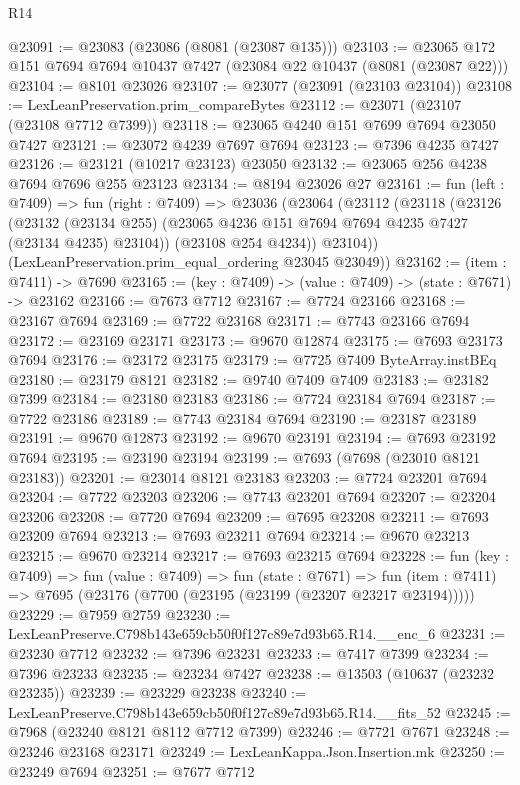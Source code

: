 \begin{lexlean}{R14}
\begin{coremodule}
@23091 := @23083 (@23086 (@8081 (@23087 @135)))
@23103 := @23065 @172 @151 @7694 @7694 @10437 @7427 (@23084 @22 @10437 (@8081 (@23087 @22)))
@23104 := @8101 @23026
@23107 := @23077 (@23091 (@23103 @23104))
@23108 := LexLeanPreservation.prim_compareBytes
@23112 := @23071 (@23107 (@23108 @7712 @7399))
@23118 := @23065 @4240 @151 @7699 @7694 @23050 @7427
@23121 := @23072 @4239 @7697 @7694
@23123 := @7396 @4235 @7427
@23126 := @23121 (@10217 @23123) @23050
@23132 := @23065 @256 @4238 @7694 @7696 @255 @23123
@23134 := @8194 @23026 @27
@23161 := fun (left : @7409) =>
  fun (right : @7409) =>
  @23036
    (@23064
      (@23112
        (@23118
          (@23126
            (@23132 (@23134 @255) (@23065 @4236 @151 @7694 @7694 @4235 @7427 (@23134 @4235) @23104))
            (@23108 @254 @4234))
          @23104))
      (LexLeanPreservation.prim_equal_ordering @23045 @23049))
@23162 := (item : @7411) -> @7690
@23165 := (key : @7409) -> (value : @7409) -> (state : @7671) -> @23162
@23166 := @7673 @7712
@23167 := @7724 @23166
@23168 := @23167 @7694
@23169 := @7722 @23168
@23171 := @7743 @23166 @7694
@23172 := @23169 @23171
@23173 := @9670 @12874
@23175 := @7693 @23173 @7694
@23176 := @23172 @23175
@23179 := @7725 @7409 ByteArray.instBEq
@23180 := @23179 @8121
@23182 := @9740 @7409 @7409
@23183 := @23182 @7399
@23184 := @23180 @23183
@23186 := @7724 @23184 @7694
@23187 := @7722 @23186
@23189 := @7743 @23184 @7694
@23190 := @23187 @23189
@23191 := @9670 @12873
@23192 := @9670 @23191
@23194 := @7693 @23192 @7694
@23195 := @23190 @23194
@23199 := @7693 (@7698 (@23010 @8121 @23183))
@23201 := @23014 @8121 @23183
@23203 := @7724 @23201 @7694
@23204 := @7722 @23203
@23206 := @7743 @23201 @7694
@23207 := @23204 @23206
@23208 := @7720 @7694
@23209 := @7695 @23208
@23211 := @7693 @23209 @7694
@23213 := @7693 @23211 @7694
@23214 := @9670 @23213
@23215 := @9670 @23214
@23217 := @7693 @23215 @7694
@23228 := fun (key : @7409) =>
  fun (value : @7409) =>
  fun (state : @7671) =>
  fun (item : @7411) => @7695 (@23176 (@7700 (@23195 (@23199 (@23207 @23217 @23194)))))
@23229 := @7959 @2759
@23230 := LexLeanPreserve.C798b143e659cb50f0f127c89e7d93b65.R14.__enc_6
@23231 := @23230 @7712
@23232 := @7396 @23231
@23233 := @7417 @7399
@23234 := @7396 @23233
@23235 := @23234 @7427
@23238 := @13503 (@10637 (@23232 @23235))
@23239 := @23229 @23238
@23240 := LexLeanPreserve.C798b143e659cb50f0f127c89e7d93b65.R14.__fits_52
@23245 := @7968 (@23240 @8121 @8112 @7712 @7399)
@23246 := @7721 @7671
@23248 := @23246 @23168 @23171
@23249 := LexLeanKappa.Json.Insertion.mk
@23250 := @23249 @7694
@23251 := @7677 @7712

\end{coremodule}
\end{lexlean}
